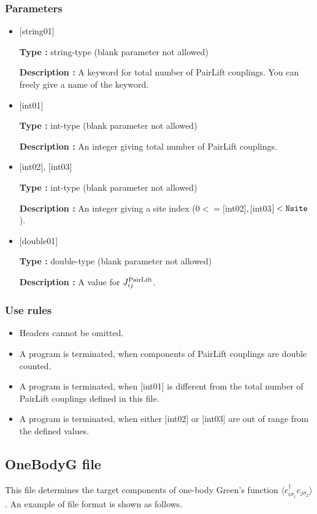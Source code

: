 \subsubsection{Parameters}
 \begin{itemize}

 \item  $[$string01$]$
   
    {\bf Type :} string-type (blank parameter not allowed)

   {\bf Description :}  A keyword for total number of PairLift couplings. You can freely give a name of the keyword.

   \item  $[$int01$]$
   
    {\bf Type :} int-type (blank parameter not allowed)

   {\bf Description :} An integer giving total number of PairLift couplings.

  \item  $[$int02$]$, $[$int03$]$
  
 {\bf Type :} int-type (blank parameter not allowed)

{\bf Description :} An integer giving a site index ($0<= [$int02$], [$int03$]<\verb|Nsite|$).
 
 \item  $[$double01$]$
   
   {\bf Type :} double-type (blank parameter not allowed)

  {\bf Description :}  A value for $J_{ij}^{\rm PairLift}$.
    
\end{itemize}

\subsubsection{Use rules}
\begin{itemize}
\item Headers cannot be omitted. 
\item A program is terminated, when components of PairLift couplings are double counted.
\item A program is terminated, when $[$int01$]$ is different from the total number of PairLift couplings defined in this file.
\item A program is terminated, when either $[$int02$]$ or $[$int03$]$ are out of range from the defined values.
\end{itemize}

\newpage
\subsection{OneBodyG file}
\label{Subsec:onebodyg}
This file determines the target components of one-body Green's function $\langle c_{i\sigma_1}^{\dagger}c_{j\sigma_2}\rangle$. An example of file format is shown as follows.


